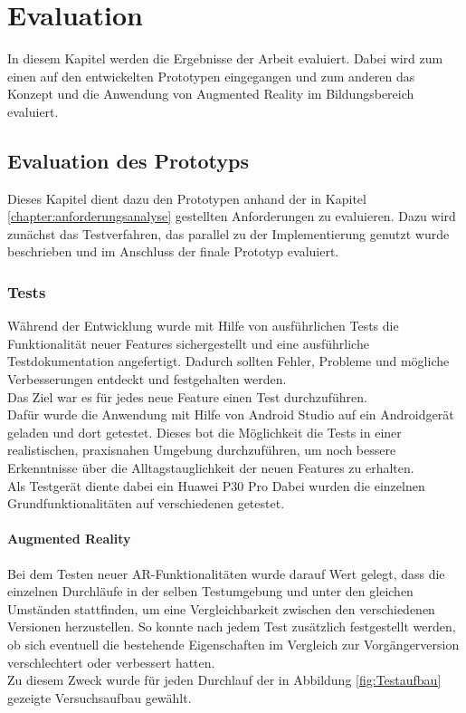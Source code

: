 \chapter{Evaluation}\label{chapter:evaluation}
In diesem Kapitel werden die Ergebnisse der Arbeit evaluiert. Dabei wird zum einen auf den entwickelten Prototypen eingegangen und zum anderen das Konzept und die Anwendung von Augmented Reality im Bildungsbereich evaluiert.

\section{Evaluation des Prototyps}
Dieses Kapitel dient dazu den Prototypen anhand der in Kapitel \ref{chapter:anforderungsanalyse} gestellten Anforderungen zu evaluieren. Dazu wird zunächst das Testverfahren, das parallel zu der Implementierung genutzt wurde beschrieben und im Anschluss der finale Prototyp evaluiert.

\subsection{Tests}\label{sec:Tests}
Während der Entwicklung wurde mit Hilfe von ausführlichen Tests die Funktionalität neuer Features sichergestellt und eine ausführliche Testdokumentation angefertigt. Dadurch sollten Fehler, Probleme und mögliche Verbesserungen entdeckt und festgehalten werden. \\
Das Ziel war es für jedes neue Feature einen Test durchzuführen.\\
Dafür wurde die Anwendung mit Hilfe von Android Studio auf ein Androidgerät geladen und dort getestet.
Dieses bot die Möglichkeit die Tests in einer realistischen, praxisnahen Umgebung durchzuführen, um noch bessere Erkenntnisse über die Alltagstauglichkeit der neuen Features zu erhalten. \\
Als Testgerät diente dabei ein Huawei P30 Pro
Dabei wurden die einzelnen Grundfunktionalitäten auf verschiedenen getestet.

\subsubsection{Augmented Reality}\label{sec:Testdurchführung}
Bei dem Testen neuer AR-Funktionalitäten wurde darauf Wert gelegt, dass die einzelnen Durchläufe in der selben Testumgebung und unter den gleichen Umständen stattfinden, um eine Vergleichbarkeit zwischen den verschiedenen Versionen herzustellen.
So konnte nach jedem Test zusätzlich festgestellt werden, ob sich eventuell die bestehende Eigenschaften im Vergleich zur Vorgängerversion verschlechtert oder verbessert hatten. \\
Zu diesem Zweck wurde für jeden Durchlauf der in Abbildung \ref{fig:Testaufbau} gezeigte Versuchsaufbau gewählt.

